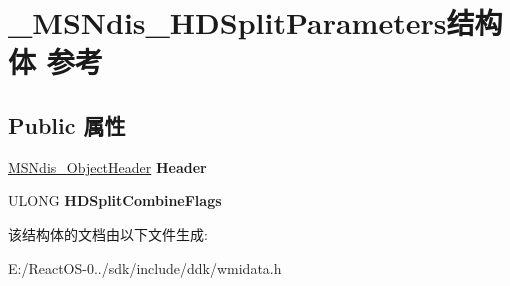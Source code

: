\hypertarget{struct___m_s_ndis___h_d_split_parameters}{}\section{\+\_\+\+M\+S\+Ndis\+\_\+\+H\+D\+Split\+Parameters结构体 参考}
\label{struct___m_s_ndis___h_d_split_parameters}
\subsection*{Public 属性}
\begin{DoxyCompactItemize}
\item 
\mbox{\label{struct___m_s_ndis___h_d_split_parameters_adb2acf386be036fcc84c703fd1ea3c91}} 
\hyperlink{struct___m_s_ndis___object_header}{M\+S\+Ndis\+\_\+\+Object\+Header} {\bfseries Header}
\item 
\mbox{\label{struct___m_s_ndis___h_d_split_parameters_a19462bb6c17e1ae1348a5b8dc97c3248}} 
U\+L\+O\+NG {\bfseries H\+D\+Split\+Combine\+Flags}
\end{DoxyCompactItemize}


该结构体的文档由以下文件生成\+:\begin{DoxyCompactItemize}
\item 
E\+:/\+React\+O\+S-\/0../sdk/include/ddk/wmidata.\+h\end{DoxyCompactItemize}
